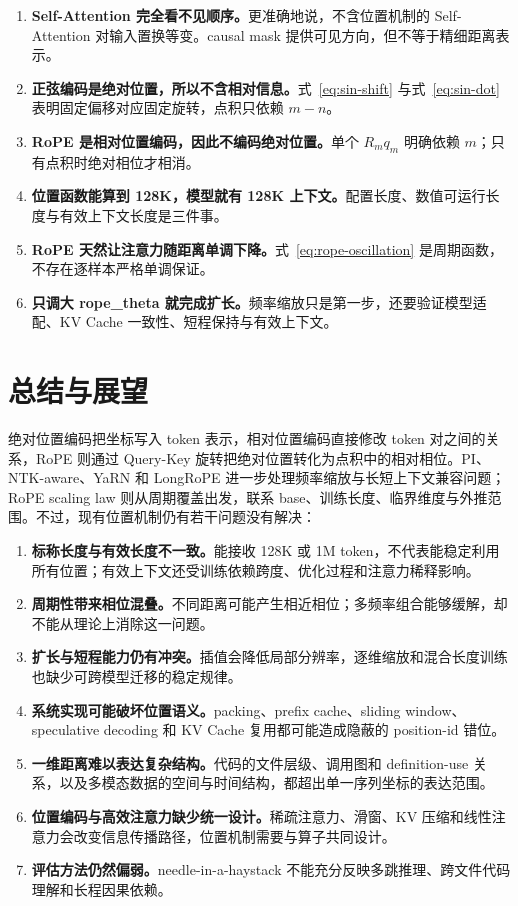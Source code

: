 \documentclass[UTF8,fontset=none,a4paper,10pt]{ctexart}
\begin{document}
\begin{enumerate}
  \item \textbf{Self-Attention 完全看不见顺序。}更准确地说，不含位置机制的 Self-Attention 对输入置换等变。causal mask 提供可见方向，但不等于精细距离表示。
  \item \textbf{正弦编码是绝对位置，所以不含相对信息。}式~\eqref{eq:sin-shift} 与式~\eqref{eq:sin-dot} 表明固定偏移对应固定旋转，点积只依赖 $m-n$。
  \item \textbf{RoPE 是相对位置编码，因此不编码绝对位置。}单个 $R_mq_m$ 明确依赖 $m$；只有点积时绝对相位才相消。
  \item \textbf{位置函数能算到 128K，模型就有 128K 上下文。}配置长度、数值可运行长度与有效上下文长度是三件事。
  \item \textbf{RoPE 天然让注意力随距离单调下降。}式~\eqref{eq:rope-oscillation} 是周期函数，不存在逐样本严格单调保证。
  \item \textbf{只调大 \textnormal{rope\_theta} 就完成扩长。}频率缩放只是第一步，还要验证模型适配、KV Cache 一致性、短程保持与有效上下文。
\end{enumerate}

\section{总结与展望}

绝对位置编码把坐标写入 token 表示，相对位置编码直接修改 token 对之间的关系，RoPE 则通过 Query-Key 旋转把绝对位置转化为点积中的相对相位。PI、NTK-aware、YaRN 和 LongRoPE 进一步处理频率缩放与长短上下文兼容问题；RoPE scaling law 则从周期覆盖出发，联系 base、训练长度、临界维度与外推范围。不过，现有位置机制仍有若干问题没有解决：

\begin{enumerate}
  \item \textbf{标称长度与有效长度不一致。}能接收 128K 或 1M token，不代表能稳定利用所有位置；有效上下文还受训练依赖跨度、优化过程和注意力稀释影响。
  \item \textbf{周期性带来相位混叠。}不同距离可能产生相近相位；多频率组合能够缓解，却不能从理论上消除这一问题。
  \item \textbf{扩长与短程能力仍有冲突。}插值会降低局部分辨率，逐维缩放和混合长度训练也缺少可跨模型迁移的稳定规律。
  \item \textbf{系统实现可能破坏位置语义。}packing、prefix cache、sliding window、speculative decoding 和 KV Cache 复用都可能造成隐蔽的 position-id 错位。
  \item \textbf{一维距离难以表达复杂结构。}代码的文件层级、调用图和 definition-use 关系，以及多模态数据的空间与时间结构，都超出单一序列坐标的表达范围。
  \item \textbf{位置编码与高效注意力缺少统一设计。}稀疏注意力、滑窗、KV 压缩和线性注意力会改变信息传播路径，位置机制需要与算子共同设计。
  \item \textbf{评估方法仍然偏弱。}needle-in-a-haystack 不能充分反映多跳推理、跨文件代码理解和长程因果依赖。
\end{enumerate}
\end{document}
